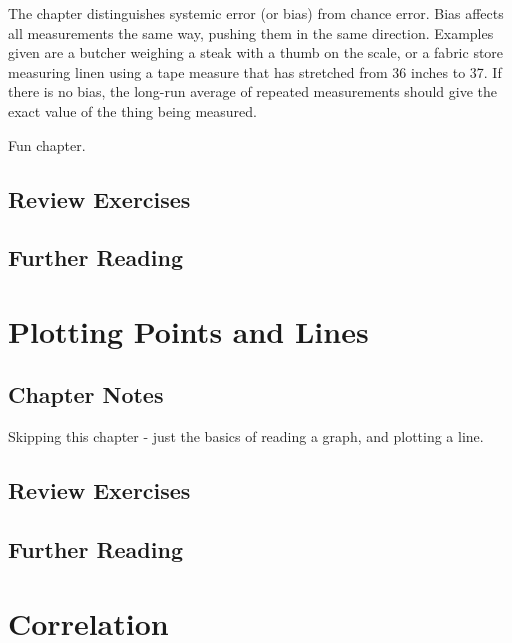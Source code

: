 \documentclass[
]{book}
\begin{document}
The chapter distinguishes systemic error (or bias) from chance error. Bias affects all measurements the same way, pushing them in the same direction. Examples given are a butcher weighing a steak with a thumb on the scale, or a fabric store measuring linen using a tape measure that has stretched from 36 inches to 37. If there is no bias, the long-run average of repeated measurements should give the exact value of the thing being measured.

Fun chapter.

\hypertarget{review-exercises-4}{%
\section{Review Exercises}\label{review-exercises-4}}

\hypertarget{further-reading-5}{%
\section*{Further Reading}\label{further-reading-5}}

\hypertarget{plotting}{%
\chapter{Plotting Points and Lines}\label{plotting}}

\hypertarget{chapter-notes-6}{%
\section{Chapter Notes}\label{chapter-notes-6}}

Skipping this chapter - just the basics of reading a graph, and plotting a line.

\hypertarget{review-exercises-5}{%
\section{Review Exercises}\label{review-exercises-5}}

\hypertarget{further-reading-6}{%
\section*{Further Reading}\label{further-reading-6}}

\hypertarget{correlation}{%
\chapter{Correlation}\label{correlation}}
\end{document}
